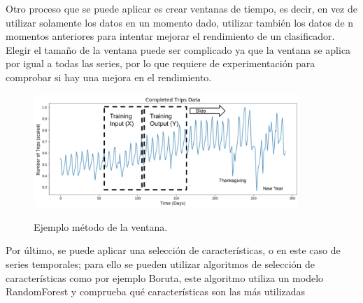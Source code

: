 Otro proceso que se puede aplicar es crear ventanas de tiempo, es decir, en vez de utilizar solamente los datos en un momento dado, utilizar también los datos de n momentos anteriores para intentar mejorar el rendimiento de un clasificador. Elegir el tamaño de la ventana puede ser complicado ya que la ventana se aplica por igual a todas las series, por lo que requiere de experimentación para comprobar si hay una mejora en el rendimiento.\newline


\begin{figure}[h]
	\centering
	\includegraphics[width=100mm]{imagenes/sliding_window_ts.png}
	\label{fig:12}
	\caption{Ejemplo método de la ventana.}
\end{figure}
\verticalspace

Por último, se puede aplicar una selección de características, o en este caso de series temporales; para ello se pueden utilizar algoritmos de selección de características como por ejemplo Boruta, este algoritmo utiliza un modelo RandomForest y comprueba qué características son las más utilizadas 
